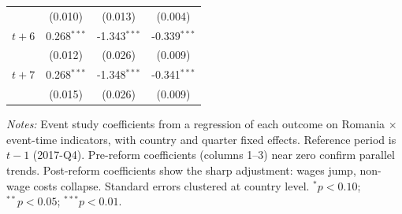 \begin{table}[htbp]
\begin{threeparttable}
\begin{tabular}{lccc}
 & (0.010) & (0.013) & (0.004) \\
$t+6$ & 0.268$^{***}$ & -1.343$^{***}$ & -0.339$^{***}$ \\
 & (0.012) & (0.026) & (0.009) \\
$t+7$ & 0.268$^{***}$ & -1.348$^{***}$ & -0.341$^{***}$ \\
 & (0.015) & (0.026) & (0.009) \\
\bottomrule
\end{tabular}
\begin{tablenotes}[flushleft]\footnotesize
\item \textit{Notes:} Event study coefficients from a regression of each outcome on Romania $\times$ event-time indicators, with country and quarter fixed effects. Reference period is $t-1$ (2017-Q4). Pre-reform coefficients (columns 1--3) near zero confirm parallel trends. Post-reform coefficients show the sharp adjustment: wages jump, non-wage costs collapse. Standard errors clustered at country level. $^{*}p<0.10$; $^{**}p<0.05$; $^{***}p<0.01$.
\end{tablenotes}
\end{threeparttable}
\end{table}
